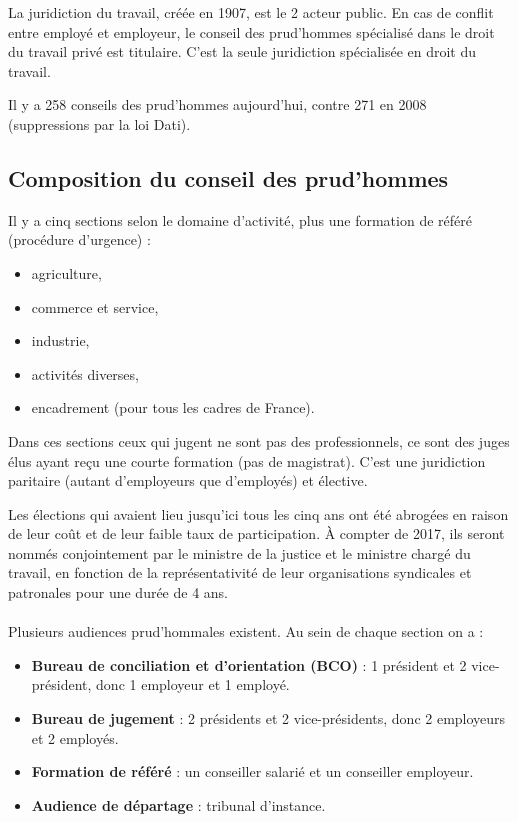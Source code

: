 La juridiction du travail, créée en 1907, est le 2 acteur public.
En cas de conflit entre employé et employeur, le conseil des prud’hommes spécialisé dans le droit du travail privé est titulaire.
C'est la seule juridiction spécialisée en droit du travail.

Il y a 258 conseils des prud'hommes aujourd'hui, contre 271 en 2008 (suppressions par la loi Dati).

\subsection{Composition du conseil des prud’hommes}

	Il y a cinq sections selon le domaine d'activité, plus une formation de référé (procédure d'urgence) :
	\begin{itemize}
		\item[\textbullet] agriculture,
		\item[\textbullet] commerce et service,
		\item[\textbullet] industrie,
		\item[\textbullet] activités diverses,
		\item[\textbullet] encadrement (pour tous les cadres de France).
	\end{itemize}
	
	Dans ces sections ceux qui jugent ne sont pas des professionnels, ce sont des juges élus ayant reçu une courte formation (pas de magistrat).
	C'est une juridiction paritaire (autant d'employeurs que d'employés) et élective.
	
	Les élections qui avaient lieu jusqu'ici tous les cinq ans ont été abrogées en raison de leur coût et de leur faible taux de participation.
	À compter de 2017, ils seront nommés conjointement par le ministre de la justice et le ministre chargé du travail, en fonction de la représentativité de leur organisations syndicales et patronales pour une durée de 4 ans.

	\paragraph{}
	Plusieurs audiences prud’hommales existent.
	Au sein de chaque section on a :
	\begin{itemize}
		\item[\textbullet] \textbf{Bureau de conciliation et d'orientation (BCO)} : 1 président et 2 vice-président, donc 1 employeur et 1 employé.
		\item[\textbullet] \textbf{Bureau de jugement} : 2 présidents et 2 vice-présidents, donc 2 employeurs et 2 employés.
		\item[\textbullet] \textbf{Formation de référé} : un conseiller salarié et un conseiller employeur.
		\item[\textbullet] \textbf{Audience de départage} : tribunal d'instance.
	\end{itemize}
	
